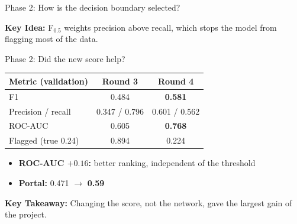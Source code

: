 \documentclass{beamer}
\newcommand{\takeaway}[1]{\par\vspace{0.4em}\noindent\textbf{Key Takeaway:} #1}
\begin{document}
\begin{frame}{Phase 2: How is the decision boundary selected?}
\begin{center}
\end{center}
\textbf{Key Idea:} F$_{0.5}$ weights precision above recall, which stops the model from flagging most of the data.
\end{frame}

\begin{frame}{Phase 2: Did the new score help?}
\begin{center}
\small
\begin{tabular}{|l|c|c|}
\hline
\textbf{Metric (validation)} & \textbf{Round 3} & \textbf{Round 4} \\
\hline
F1 & 0.484 & \textbf{0.581} \\
Precision / recall & 0.347 / 0.796 & 0.601 / 0.562 \\
ROC-AUC & 0.605 & \textbf{0.768} \\
Flagged (true 0.24) & 0.894 & 0.224 \\
\hline
\end{tabular}
\end{center}
\begin{itemize}
  \item \textbf{ROC-AUC $+0.16$:} better ranking, independent of the threshold
  \item \textbf{Portal:} 0.471 $\rightarrow$ \textbf{0.59}
\end{itemize}
\takeaway{Changing the score, not the network, gave the largest gain of the project.}
\end{frame}
\end{document}
